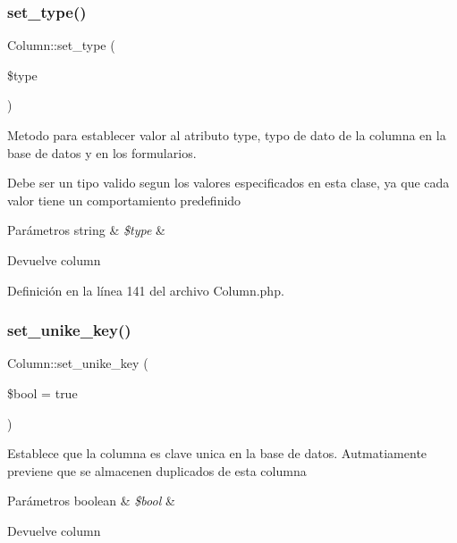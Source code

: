 \subsubsection{\texorpdfstring{set\_type()}{set\_type()}}
{\footnotesize\ttfamily Column\+::set\+\_\+type (\begin{DoxyParamCaption}\item[{}]{\$type }\end{DoxyParamCaption})}

Metodo para establecer valor al atributo type, typo de dato de la columna en la base de datos y en los formularios.

Debe ser un tipo valido segun los valores especificados en esta clase, ya que cada valor tiene un comportamiento predefinido


\begin{DoxyParams}[1]{Parámetros}
string & {\em \$type} & \\
\hline
\end{DoxyParams}
\begin{DoxyReturn}{Devuelve}
column 
\end{DoxyReturn}


Definición en la línea 141 del archivo Column.\+php.

\mbox{\label{class_column_afc2755d3457a6f80517b6ba695e793cf}} 
\subsubsection{\texorpdfstring{set\_unike\_key()}{set\_unike\_key()}}
{\footnotesize\ttfamily Column\+::set\+\_\+unike\+\_\+key (\begin{DoxyParamCaption}\item[{}]{\$bool = {\ttfamily true} }\end{DoxyParamCaption})}

Establece que la columna es clave unica en la base de datos. Autmatiamente previene que se almacenen duplicados de esta columna


\begin{DoxyParams}[1]{Parámetros}
boolean & {\em \$bool} & \\
\hline
\end{DoxyParams}
\begin{DoxyReturn}{Devuelve}
column 
\end{DoxyReturn}


